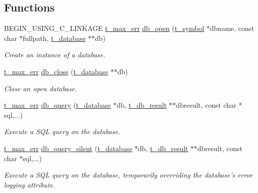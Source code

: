 \subsection*{Functions}
\begin{DoxyCompactItemize}
\item 
BEGIN\_\-USING\_\-C\_\-LINKAGE \hyperlink{group__datatypes_ga73edaae82b318855cc09fac994918165}{t\_\-max\_\-err} \hyperlink{group__database_gac709a497fcc55817c1c9292bd59eb03f}{db\_\-open} (\hyperlink{structt__symbol}{t\_\-symbol} $\ast$dbname, const char $\ast$fullpath, \hyperlink{structt__object}{t\_\-database} $\ast$$\ast$db)
\begin{DoxyCompactList}\small\item\em Create an instance of a database. \item\end{DoxyCompactList}\item 
\hyperlink{group__datatypes_ga73edaae82b318855cc09fac994918165}{t\_\-max\_\-err} \hyperlink{group__database_ga697cbcbe4c14944fc5a4a535039f5e1b}{db\_\-close} (\hyperlink{structt__object}{t\_\-database} $\ast$$\ast$db)
\begin{DoxyCompactList}\small\item\em Close an open database. \item\end{DoxyCompactList}\item 
\hyperlink{group__datatypes_ga73edaae82b318855cc09fac994918165}{t\_\-max\_\-err} \hyperlink{group__database_ga70fac948e0a17e91d80c064765d5d016}{db\_\-query} (\hyperlink{structt__object}{t\_\-database} $\ast$db, \hyperlink{structt__object}{t\_\-db\_\-result} $\ast$$\ast$dbresult, const char $\ast$sql,...)
\begin{DoxyCompactList}\small\item\em Execute a SQL query on the database. \item\end{DoxyCompactList}\item 
\hyperlink{group__datatypes_ga73edaae82b318855cc09fac994918165}{t\_\-max\_\-err} \hyperlink{group__database_gae756dda46aa61036ccc896ad9448c496}{db\_\-query\_\-silent} (\hyperlink{structt__object}{t\_\-database} $\ast$db, \hyperlink{structt__object}{t\_\-db\_\-result} $\ast$$\ast$dbresult, const char $\ast$sql,...)
\begin{DoxyCompactList}\small\item\em Execute a SQL query on the database, temporarily overriding the database's error logging attribute. \item\end{DoxyCompactList}\item 

\end{DoxyCompactItemize}
